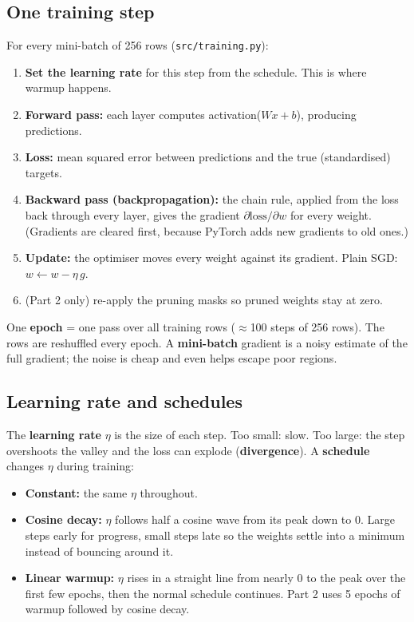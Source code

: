 \documentclass[11pt,a4paper]{article}
\begin{document}
\subsection{One training step}
For every mini-batch of 256 rows (\texttt{src/training.py}):
\begin{enumerate}
  \item \textbf{Set the learning rate} for this step from the schedule. This is where warmup happens.
  \item \textbf{Forward pass:} each layer computes activation($Wx + b$), producing predictions.
  \item \textbf{Loss:} mean squared error between predictions and the true (standardised) targets.
  \item \textbf{Backward pass (backpropagation):} the chain rule, applied from the loss back through every layer, gives
        the gradient $\partial\text{loss}/\partial w$ for every weight. (Gradients are cleared first, because PyTorch adds
        new gradients to old ones.)
  \item \textbf{Update:} the optimiser moves every weight against its gradient. Plain SGD: $w \leftarrow w - \eta\, g$.
  \item (Part 2 only) re-apply the pruning masks so pruned weights stay at zero.
\end{enumerate}
One \textbf{epoch} = one pass over all training rows ($\approx$100 steps of 256 rows). The rows are reshuffled every
epoch. A \textbf{mini-batch} gradient is a noisy estimate of the full gradient; the noise is cheap and even helps escape
poor regions.

\subsection{Learning rate and schedules}
The \textbf{learning rate} $\eta$ is the size of each step. Too small: slow. Too large: the step overshoots the valley and
the loss can explode (\textbf{divergence}). A \textbf{schedule} changes $\eta$ during training:
\begin{itemize}
  \item \textbf{Constant:} the same $\eta$ throughout.
  \item \textbf{Cosine decay:} $\eta$ follows half a cosine wave from its peak down to 0. Large steps early for progress,
        small steps late so the weights settle into a minimum instead of bouncing around it.
  \item \textbf{Linear warmup:} $\eta$ rises in a straight line from nearly 0 to the peak over the first few epochs, then the
        normal schedule continues. Part 2 uses 5 epochs of warmup followed by cosine decay.
\end{itemize}
\end{document}
